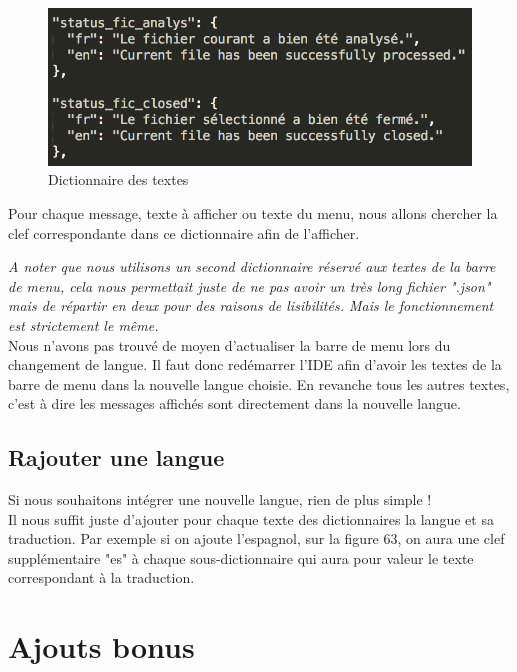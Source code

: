 \documentclass[a4paper,12pt]{article}
\begin{document}
	\begin{figure}[h!]
			\begin{center}
					\includegraphics[scale=1]{images/langue_json}
					\caption{Dictionnaire des textes}
			\end{center}
	\end{figure}
	
	Pour chaque message, texte à afficher ou texte du menu, nous allons chercher la clef correspondante dans ce dictionnaire afin de l'afficher. 
	
	\textit{A noter que nous utilisons un second dictionnaire réservé aux textes de la barre de menu, cela nous permettait juste de ne pas avoir un très long fichier ".json" mais de répartir en deux pour des raisons de lisibilités. Mais le fonctionnement est strictement le même.}\\
	
	Nous n'avons pas trouvé de moyen d'actualiser la barre de menu lors du changement de langue. Il faut donc redémarrer l'IDE afin d'avoir les textes de la barre de menu dans la nouvelle langue choisie. En revanche tous les autres textes, c'est à dire les messages affichés sont directement dans la nouvelle langue.
	
	\subsection{Rajouter une langue}

	Si nous souhaitons intégrer une nouvelle langue, rien de plus simple !\\
	
	Il nous suffit juste d'ajouter pour chaque texte des dictionnaires la langue et sa traduction. Par exemple si on ajoute l'espagnol, sur la figure 63, on aura une clef supplémentaire "es" à chaque sous-dictionnaire qui aura pour valeur le texte correspondant à la traduction.

\section{Ajouts bonus}
\end{document}
